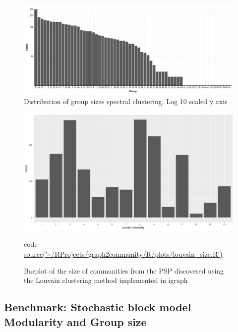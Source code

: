 \begin{figure}
    \centering
    \includegraphics[width=\textwidth]{images/chapter_community_detection/ggplot2/group_size/Rplot_log10_spectral.png}
    \caption{Distribution of group sizes spectral clustering. Log 10 scaled y axis}
    \label{fig:group sizes spectral clustering log 10}
\end{figure}

 



\begin{figure}
    \centering
    \includegraphics[width=\textwidth]{images/Rplot_Louvain_community_sizes.png}
    \caption{Barplot of the size of communities from the PSP discovered using the Louvain clustering method implemented in igraph}
    \label{fig:barplot_size_commmunities_using_louvain}
    \tiny{code \url{source('~/RProjects/graph2community/R/plots/louvain_size.R')}}
\end{figure}








\subsection{Benchmark: Stochastic block model Modularity and Group size}
\label{sec:benchmark sbm}

